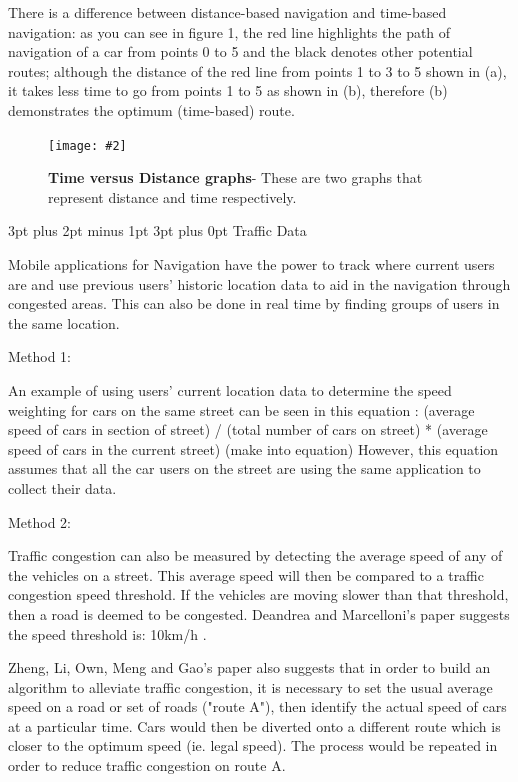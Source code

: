 \documentclass[12pt,a4paper]{article}
\makeatletter
\newcommand{\figuremacro}[5]{
    \begin{figure}[#1]
        \centering
        \texttt{[image: \#2]}
        \caption[#3]{\textbf{#3}#4}
        \label{fig:#2}
    \end{figure}
}
\renewcommand\subsection{\@startsection {subsection}{1}{0mm} %
                               {3pt plus 2pt minus 1pt} %
                               {3pt plus 0pt} %
                               {\normalfont\bfseries}}
\makeatother
\begin{document}
There is a difference between distance-based navigation and time-based navigation: as you can see in figure 1, the red line highlights the path of navigation of a car from points 0 to 5 and the black denotes other potential routes; although the distance 
of the red line from points 1 to 3 to 5 shown in (a), it takes less time to go from points 1 to 5 as shown in (b), therefore (b) demonstrates the optimum (time-based) route.


\figuremacro{h}{TimevsDistanceWeightFactors}{Time versus Distance graphs}{- These are two graphs that represent distance and time respectively.}{0.6} 

\subsection{Traffic Data}

Mobile applications for Navigation have the power to track where current users are and use previous users’ historic location data to aid in the navigation through congested areas. This can also be done in real time by finding groups of users in the same location.

Method 1:

An example of using users’ current location data to determine the speed weighting for cars on the same street can be seen in this equation \cite{Zheng2018}: (average speed of cars in section of street) / (total number of cars on street) * (average speed of cars in the current street) (make into equation) However, this equation assumes that all the car users on the street are using the same application to collect their data. 



Method 2:



Traffic congestion can also be measured by detecting the average speed of any of the vehicles on a street. This average speed will then be compared to a traffic congestion speed threshold. If the vehicles are moving slower than that threshold, then a road is deemed to be congested. Deandrea and Marcelloni’s paper suggests the speed threshold is: 10km/h \cite{DAndrea2017}.



Zheng, Li, Own, Meng and Gao’s paper also suggests that in order to build an algorithm to alleviate traffic congestion, it is necessary to set the usual average speed on a road or set of roads ("route A"), then identify the actual speed of cars at a particular time. Cars would then be diverted onto a different route which is closer to the optimum speed (ie. legal speed). The process would be repeated in order to reduce traffic congestion on route A. \cite{Zheng2018}
\end{document}
